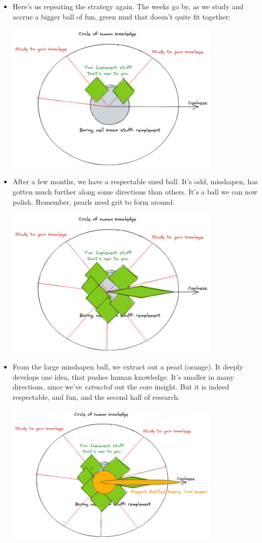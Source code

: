\documentclass{article}
\begin{document}
\begin{itemize}
\item Here's us repeating the strategy again. The weeks go by, as we study and accrue a bigger ball of fun, green mud
     that doesn't quite fit together:

\includegraphics[width=0.8\textwidth]{./images/research-4.png}


\item After a few months, we have a respectable sized ball. It's odd, misshapen, has gotten much further along
  some directions than others. It's a ball we can now polish. Remember, pearls need grit to form around.

\includegraphics[width=0.8\textwidth]{./images/research-5.png}


\item From the large misshapen ball, we extract out a pearl (orange). It deeply
  develops one idea, that pushes human knowledge. It's smaller in many directions, since
  we've \emph{extracted} out the core insight. But it is indeed respectable, and fun, and the second
  half of research.

\includegraphics[width=0.8\textwidth]{./images/research-6.png}


\end{itemize}
\end{document}

